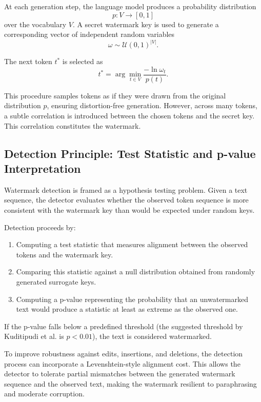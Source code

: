 At each generation step, the language model produces a probability distribution
\[
    p : V \rightarrow [0,1]
\]
over the vocabulary \(V\). A secret watermark key is used to generate a corresponding vector of independent random variables
\[
    \omega \sim \mathcal{U}(0,1)^{|V|}.
\]

The next token \(t^\ast\) is selected as
\[
    t^\ast = \arg\min_{t \in V} \frac{-\ln \omega_t}{p(t)}.
\]

This procedure samples tokens as if they were drawn from the original distribution \(p\), ensuring distortion-free generation. However, across many tokens, a subtle correlation is introduced between the chosen tokens and the secret key. This correlation constitutes the watermark.

\subsection{Detection Principle: Test Statistic and p-value Interpretation}

Watermark detection is framed as a hypothesis testing problem. Given a text sequence, the detector evaluates whether the observed token sequence is more consistent with the watermark key than would be expected under random keys.

Detection proceeds by:
\begin{enumerate}
    \item Computing a test statistic that measures alignment between the observed tokens and the watermark key.
    \item Comparing this statistic against a null distribution obtained from randomly generated surrogate keys.
    \item Computing a p-value representing the probability that an unwatermarked text would produce a statistic at least as extreme as the observed one.
\end{enumerate}

If the p-value falls below a predefined threshold (the suggested threshold by Kuditipudi et al. is \(p < 0.01\)), the text is considered watermarked.

To improve robustness against edits, insertions, and deletions, the detection process can incorporate a Levenshtein-style alignment cost. This allows the detector to tolerate partial mismatches between the generated watermark sequence and the observed text, making the watermark resilient to paraphrasing and moderate corruption.
